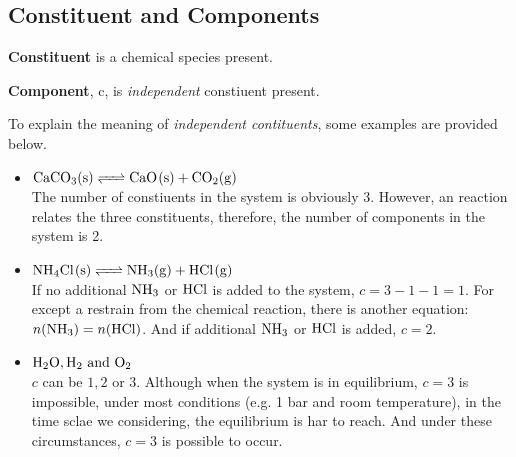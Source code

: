 \subsection{Constituent and Components}
\begin{definition}
    \textbf{Constituent} is a chemical species present.
\end{definition}
\begin{definition}
    \textbf{Component}, c, is \emph{independent} constiuent present.
\end{definition}
\begin{example}
    To explain the meaning of \emph{independent contituents}, some examples are provided below.\\
    \begin{itemize}
        \item $\ce{CaCO3(s) <=> CaO(s) + CO2(g)}$\\
        The number of constiuents in the system is obviously 3. However, an reaction relates the three constituents, therefore, the number of components in the system is 2.
        \item $\ce{NH4Cl(s) <=> NH3(g) + HCl(g)}$\\
        If no additional $\ce{NH3}$ or $\ce{HCl}$ is added to the system, $c=3-1-1=1$. For except a restrain from the chemical reaction, there is another equation: $n(\ce{NH3})=n(\ce{HCl})$. And if additional $\ce{NH3}$ or $\ce{HCl}$ is added, $c=2$.
        \item $\ce{H2O}, \ce{H2} \text{ and } \ce{O2}$\\
        $c$ can be $1, 2$ or $3$. Although when the system is in equilibrium, $c=3$ is impossible, under most conditions (e.g. 1 \si{bar} and room temperature), in the time sclae we considering, the equilibrium is har to reach. And under these circumstances, $c=3$ is possible to occur.
    \end{itemize}
\end{example}
